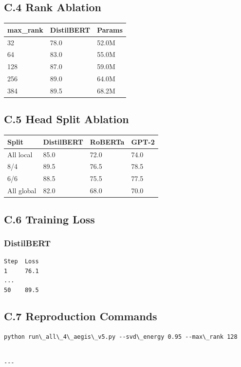 \subsection{C.4 Rank Ablation}

\begin{table}[H]
\centering
\small
\begin{tabular}{lll}
\toprule
\textbf{max\_rank} & \textbf{DistilBERT} & \textbf{Params} \\
\midrule
32 & 78.0 & 52.0M \\
64 & 83.0 & 55.0M \\
128 & 87.0 & 59.0M \\
256 & 89.0 & 64.0M \\
384 & 89.5 & 68.2M \\
\bottomrule
\end{tabular}
\end{table}

\subsection{C.5 Head Split Ablation}

\begin{table}[H]
\centering
\small
\begin{tabular}{llll}
\toprule
\textbf{Split} & \textbf{DistilBERT} & \textbf{RoBERTa} & \textbf{GPT-2} \\
\midrule
All local & 85.0 & 72.0 & 74.0 \\
8/4 & 89.5 & 76.5 & 78.5 \\
6/6 & 88.5 & 75.5 & 77.5 \\
All global & 82.0 & 68.0 & 70.0 \\
\bottomrule
\end{tabular}
\end{table}

\subsection{C.6 Training Loss}

\subsubsection{DistilBERT}
\begin{lstlisting}
Step  Loss
1     76.1
...
50    89.5
\end{lstlisting}

\subsection{C.7 Reproduction Commands}

\begin{lstlisting}
python run\_all\_4\_aegis\_v5.py --svd\_energy 0.95 --max\_rank 128
\end{lstlisting}
\begin{lstlisting}

---
\end{lstlisting}